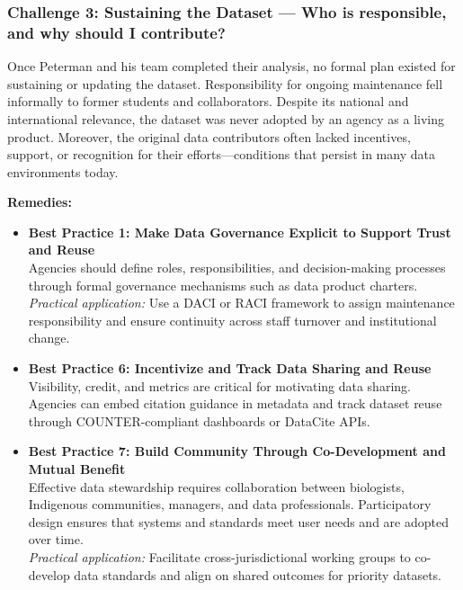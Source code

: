 \documentclass[
  letterpaper,
  DIV=11,
  numbers=noendperiod]{scrartcl}
\begin{document}
\subsubsection{Challenge 3: Sustaining the Dataset --- Who is
responsible, and why should I
contribute?}\label{challenge-3-sustaining-the-dataset-who-is-responsible-and-why-should-i-contribute}

Once Peterman and his team completed their analysis, no formal plan
existed for sustaining or updating the dataset. Responsibility for
ongoing maintenance fell informally to former students and
collaborators. Despite its national and international relevance, the
dataset was never adopted by an agency as a living product. Moreover,
the original data contributors often lacked incentives, support, or
recognition for their efforts---conditions that persist in many data
environments today.

\textbf{Remedies:}

\begin{itemize}
\item
  \textbf{Best Practice 1: Make Data Governance Explicit to Support
  Trust and Reuse\\
  }Agencies should define roles, responsibilities, and decision-making
  processes through formal governance mechanisms such as data product
  charters.\\
  \emph{Practical application:} Use a DACI or RACI framework to assign
  maintenance responsibility and ensure continuity across staff turnover
  and institutional change.
\item
  \textbf{Best Practice 6: Incentivize and Track Data Sharing and
  Reuse\\
  }Visibility, credit, and metrics are critical for motivating data
  sharing. Agencies can embed citation guidance in metadata and track
  dataset reuse through COUNTER-compliant dashboards or DataCite APIs.
\item
  \textbf{Best Practice 7: Build Community Through Co-Development and
  Mutual Benefit\\
  } Effective data stewardship requires collaboration between
  biologists, Indigenous communities, managers, and data professionals.
  Participatory design ensures that systems and standards meet user
  needs and are adopted over time.\\
  \emph{Practical application:} Facilitate cross-jurisdictional working
  groups to co-develop data standards and align on shared outcomes for
  priority datasets.
\end{itemize}
\end{document}
